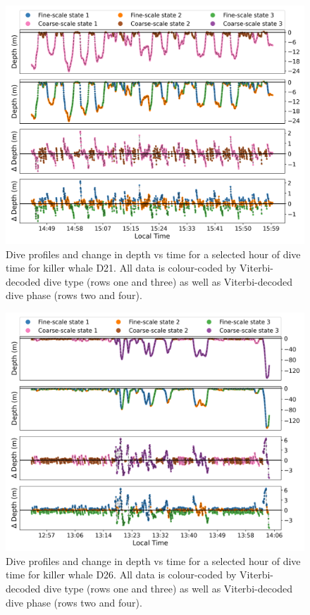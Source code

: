 \documentclass[12pt]{article}
\begin{document}
\begin{figure}[H]
    \centering
    \includegraphics[width=6.5in]{../plt/decoded_dives_kw_D21_K_3_3_nWhales_8.png}
    \caption{Dive profiles and change in depth vs time for a selected hour of dive time for killer whale D21. All data is colour-coded by Viterbi-decoded dive type (rows one and three) as well as Viterbi-decoded dive phase (rows two and four).}
    \label{fig:D21}
\end{figure}

\begin{figure}[H]
    \centering
    \includegraphics[width=6.5in]{../plt/decoded_dives_kw_D26_K_3_3_nWhales_8.png}
    \caption{Dive profiles and change in depth vs time for a selected hour of dive time for killer whale D26. All data is colour-coded by Viterbi-decoded dive type (rows one and three) as well as Viterbi-decoded dive phase (rows two and four).}
    \label{fig:D26}
\end{figure}
\end{document}
